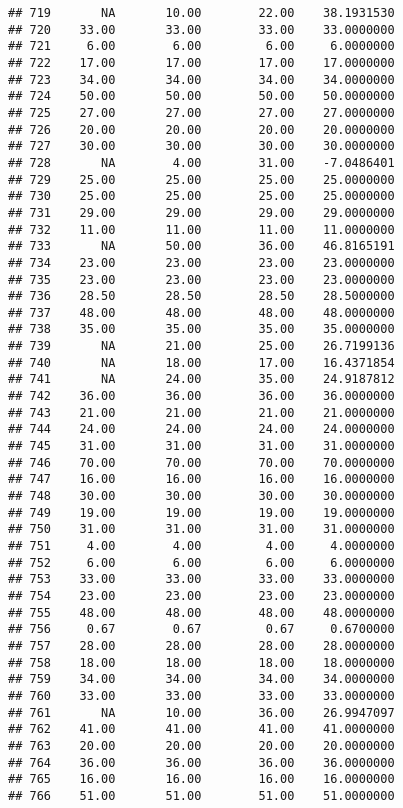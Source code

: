\documentclass[
]{article}
\begin{document}
\begin{verbatim}
## 719       NA       10.00        22.00    38.1931530
## 720    33.00       33.00        33.00    33.0000000
## 721     6.00        6.00         6.00     6.0000000
## 722    17.00       17.00        17.00    17.0000000
## 723    34.00       34.00        34.00    34.0000000
## 724    50.00       50.00        50.00    50.0000000
## 725    27.00       27.00        27.00    27.0000000
## 726    20.00       20.00        20.00    20.0000000
## 727    30.00       30.00        30.00    30.0000000
## 728       NA        4.00        31.00    -7.0486401
## 729    25.00       25.00        25.00    25.0000000
## 730    25.00       25.00        25.00    25.0000000
## 731    29.00       29.00        29.00    29.0000000
## 732    11.00       11.00        11.00    11.0000000
## 733       NA       50.00        36.00    46.8165191
## 734    23.00       23.00        23.00    23.0000000
## 735    23.00       23.00        23.00    23.0000000
## 736    28.50       28.50        28.50    28.5000000
## 737    48.00       48.00        48.00    48.0000000
## 738    35.00       35.00        35.00    35.0000000
## 739       NA       21.00        25.00    26.7199136
## 740       NA       18.00        17.00    16.4371854
## 741       NA       24.00        35.00    24.9187812
## 742    36.00       36.00        36.00    36.0000000
## 743    21.00       21.00        21.00    21.0000000
## 744    24.00       24.00        24.00    24.0000000
## 745    31.00       31.00        31.00    31.0000000
## 746    70.00       70.00        70.00    70.0000000
## 747    16.00       16.00        16.00    16.0000000
## 748    30.00       30.00        30.00    30.0000000
## 749    19.00       19.00        19.00    19.0000000
## 750    31.00       31.00        31.00    31.0000000
## 751     4.00        4.00         4.00     4.0000000
## 752     6.00        6.00         6.00     6.0000000
## 753    33.00       33.00        33.00    33.0000000
## 754    23.00       23.00        23.00    23.0000000
## 755    48.00       48.00        48.00    48.0000000
## 756     0.67        0.67         0.67     0.6700000
## 757    28.00       28.00        28.00    28.0000000
## 758    18.00       18.00        18.00    18.0000000
## 759    34.00       34.00        34.00    34.0000000
## 760    33.00       33.00        33.00    33.0000000
## 761       NA       10.00        36.00    26.9947097
## 762    41.00       41.00        41.00    41.0000000
## 763    20.00       20.00        20.00    20.0000000
## 764    36.00       36.00        36.00    36.0000000
## 765    16.00       16.00        16.00    16.0000000
## 766    51.00       51.00        51.00    51.0000000

\end{verbatim}
\end{document}
